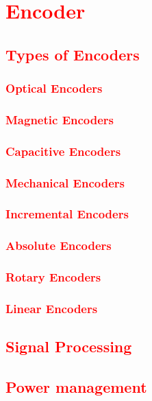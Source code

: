 \chapter{\textcolor{red}{Encoder}}
\section{\textcolor{red}{Types of Encoders}}
\subsection{\textcolor{red}{Optical Encoders}}
\subsection{\textcolor{red}{Magnetic Encoders}}
\subsection{\textcolor{red}{Capacitive Encoders}}
\subsection{\textcolor{red}{Mechanical Encoders}}
\subsection{\textcolor{red}{Incremental Encoders}}
\subsection{\textcolor{red}{Absolute Encoders}}
\subsection{\textcolor{red}{Rotary Encoders}}
\subsection{\textcolor{red}{Linear Encoders}}


\section{\textcolor{red}{Signal Processing}}

\section{\textcolor{red}{Power management}}

